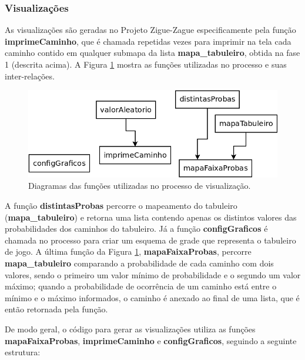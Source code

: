 \documentclass[12pt]{article}
\begin{document}
\subsubsection{Visualizações}
\label{visualizacoes}

As visualizações são geradas no Projeto Zigue-Zague especificamente pela função \textbf{imprimeCaminho}, que é chamada repetidas vezes para imprimir na tela cada caminho contido em qualquer submapa da lista \textbf{mapa\_tabuleiro}, obtida na fase 1 (descrita acima). A Figura \ref{funcoes_auxiliares_visualizacao} mostra as funções utilizadas no processo e suas inter-relações. 

\begin{figure}[ht!]
	\centering
	\includegraphics[width=0.8\linewidth]{img/funcoes_auxiliares_visualizacao.png}
	\caption{Diagramas das funções utilizadas no processo de visualização.}
	\label{funcoes_auxiliares_visualizacao}
\end{figure}

A função \textbf{distintasProbas} percorre o mapeamento do tabuleiro (\textbf{mapa\_tabuleiro}) e retorna uma lista contendo apenas os distintos valores das probabilidades dos caminhos do tabuleiro. Já a função \textbf{configGraficos} é chamada no processo para criar um esquema de grade que representa o tabuleiro de jogo. A última função da Figura \ref{funcoes_auxiliares_visualizacao}, \textbf{mapaFaixaProbas}, percorre \textbf{mapa\_tabuleiro} comparando a probabilidade de cada caminho com dois valores, sendo o primeiro um valor mínimo de probabilidade e o segundo um valor máximo; quando a probabilidade de ocorrência de um caminho está entre o mínimo e o máximo informados, o caminho é anexado ao final de uma lista, que é então retornada pela função.

De modo geral, o código para gerar as visualizações utiliza as funções \textbf{mapaFaixaProbas}, \textbf{imprimeCaminho} e \textbf{configGraficos}, seguindo a seguinte estrutura: 
\end{document}
